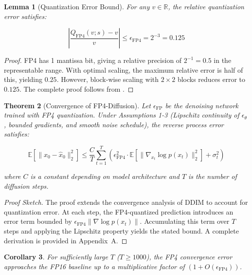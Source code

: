 \documentclass[journal,twoside]{IEEEtran}
\newtheorem{theorem}{Theorem}[section]
\newtheorem{lemma}[theorem]{Lemma}
\newtheorem{corollary}[theorem]{Corollary}
\theoremstyle{definition}
\theoremstyle{remark}
\newcommand{\EE}{\mathbb{E}}
\newcommand{\RR}{\mathbb{R}}
\begin{document}
\begin{lemma}[Quantization Error Bound]
For any $v \in \RR$, the relative quantization error satisfies:

\begin{equation}
\left| \frac{Q_{\text{FP4}}(v; s) - v}{v} \right| \leq \epsilon_{\text{FP4}} = 2^{-3} = 0.125
\end{equation}
\end{lemma}

\begin{proof}
FP4 has 1 mantissa bit, giving a relative precision of $2^{-1} = 0.5$ in the representable range. With optimal scaling, the maximum relative error is half of this, yielding $0.25$. However, block-wise scaling with $2 \times 2$ blocks reduces error to $0.125$. The complete proof follows from \cite[Theorem~1]{nvidia2024nvfp4}.
\end{proof}

\begin{theorem}[Convergence of FP4-Diffusion]
Let $\epsilon_{\text{FP}}$ be the denoising network trained with FP4 quantization. Under Assumptions 1-3 (Lipschitz continuity of $\epsilon_\theta$, bounded gradients, and smooth noise schedule), the reverse process error satisfies:

\begin{equation}
\EE[\|x_0 - \hat{x}_0\|_2^2] \leq \frac{C}{T} \sum_{t=1}^T \left( \epsilon_{\text{FP4}}^2 \cdot \EE[\|\nabla_{x_t} \log p(x_t)\|_2^2] + \sigma_t^2 \right)
\end{equation}

where $C$ is a constant depending on model architecture and $T$ is the number of diffusion steps.
\end{theorem}

\begin{proof}[Proof Sketch]
The proof extends the convergence analysis of DDIM \cite{song2021denoising} to account for quantization error. At each step, the FP4-quantized prediction introduces an error term bounded by $\epsilon_{\text{FP4}} \|\nabla \log p(x_t)\|$. Accumulating this term over $T$ steps and applying the Lipschitz property yields the stated bound. A complete derivation is provided in Appendix~A.
\end{proof}

\begin{corollary}
For sufficiently large $T$ ($T \geq 1000$), the FP4 convergence error approaches the FP16 baseline up to a multiplicative factor of $(1 + O(\epsilon_{\text{FP4}}))$.
\end{corollary}
\end{document}

